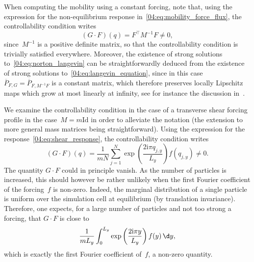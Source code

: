     When computing the mobility using a constant forcing, note that, using the expression for the non-equilibrium response in~\eqref{04:eq:mobility_force_flux}, the controllability condition writes
    \[(G\cdot F)(q) = F^\intercal M^{-1}F \neq 0,\]
    since~$M^{-1}$ is a positive definite matrix, so that the controllability condition is trivially satisfied everywhere. Moreover, the existence of strong solutions to~\eqref{04:eq:norton_langevin} can be straightforwardly deduced from the existence of strong solutions to~\eqref{04:eq:langevin_equation}, since in this case~$\overline{P}_{F,G}=\overline{P}_{F,M^{-1}F}$ is a constant matrix, which therefore preserves locally Lipschitz maps which grow at most linearly at infinity, see for instance the discussion in~\cite[Section 3.3]{P14}.

    We examine the controllability condition in the case of a transverse shear forcing profile in the case~$M=m\mathrm{Id}$ in order to alleviate the notation (the extension to more general mass matrices being straightforward). Using the expression for the response~\eqref{04:eq:shear_response}, the controllability condition writes
    \[(G\cdot F)(q) = \frac{1}{mN}\sum_{j=1}^N \exp\left({\frac{2\mathrm{i}\pi q_{j,y}}{L_y}}\right)f(q_{j,y}) \neq 0.\]
    The quantity $G\cdot F$ could in principle vanish. As the number of particles is increased, this should however be rather unlikely when the first Fourier coefficient of the forcing~$f$ is non-zero. Indeed, the marginal distribution of a single particle is uniform over the simulation cell at equilibrium (by translation invariance). Therefore, one expects, for a large number of particles and not too strong a forcing, that $G\cdot F$ is close to
    \[
    \frac{1}{m L_y} \int_{0}^{L_y} \exp\left({\frac{2\mathrm{i}\pi y}{L_y}}\right)f(y) \, \d y,
    \]
    which is exactly the first Fourier coefficient of~$f$, a non-zero quantity.

